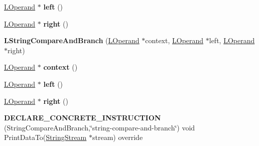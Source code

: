 \begin{DoxyCompactItemize}
\item 
\hyperlink{classv8_1_1internal_1_1_l_operand}{L\+Operand} $\ast$ {\bfseries left} ()\hypertarget{classv8_1_1internal_1_1_l_string_compare_and_branch_a03846e908189b71209c862508f37b51a}{}\label{classv8_1_1internal_1_1_l_string_compare_and_branch_a03846e908189b71209c862508f37b51a}

\item 
\hyperlink{classv8_1_1internal_1_1_l_operand}{L\+Operand} $\ast$ {\bfseries right} ()\hypertarget{classv8_1_1internal_1_1_l_string_compare_and_branch_acb46bd2af08a91bc102ec2b5e919c6b5}{}\label{classv8_1_1internal_1_1_l_string_compare_and_branch_acb46bd2af08a91bc102ec2b5e919c6b5}

\item 
{\bfseries L\+String\+Compare\+And\+Branch} (\hyperlink{classv8_1_1internal_1_1_l_operand}{L\+Operand} $\ast$context, \hyperlink{classv8_1_1internal_1_1_l_operand}{L\+Operand} $\ast$left, \hyperlink{classv8_1_1internal_1_1_l_operand}{L\+Operand} $\ast$right)\hypertarget{classv8_1_1internal_1_1_l_string_compare_and_branch_abdd07c36cdda51e9673d4ee4dfc2734d}{}\label{classv8_1_1internal_1_1_l_string_compare_and_branch_abdd07c36cdda51e9673d4ee4dfc2734d}

\item 
\hyperlink{classv8_1_1internal_1_1_l_operand}{L\+Operand} $\ast$ {\bfseries context} ()\hypertarget{classv8_1_1internal_1_1_l_string_compare_and_branch_a15d4b6ad859b22bf4141edc055fe8050}{}\label{classv8_1_1internal_1_1_l_string_compare_and_branch_a15d4b6ad859b22bf4141edc055fe8050}

\item 
\hyperlink{classv8_1_1internal_1_1_l_operand}{L\+Operand} $\ast$ {\bfseries left} ()\hypertarget{classv8_1_1internal_1_1_l_string_compare_and_branch_a03846e908189b71209c862508f37b51a}{}\label{classv8_1_1internal_1_1_l_string_compare_and_branch_a03846e908189b71209c862508f37b51a}

\item 
\hyperlink{classv8_1_1internal_1_1_l_operand}{L\+Operand} $\ast$ {\bfseries right} ()\hypertarget{classv8_1_1internal_1_1_l_string_compare_and_branch_acb46bd2af08a91bc102ec2b5e919c6b5}{}\label{classv8_1_1internal_1_1_l_string_compare_and_branch_acb46bd2af08a91bc102ec2b5e919c6b5}

\item 
{\bfseries D\+E\+C\+L\+A\+R\+E\+\_\+\+C\+O\+N\+C\+R\+E\+T\+E\+\_\+\+I\+N\+S\+T\+R\+U\+C\+T\+I\+ON} (String\+Compare\+And\+Branch,\char`\"{}string-\/compare-\/and-\/branch\char`\"{}) void Print\+Data\+To(\hyperlink{classv8_1_1internal_1_1_string_stream}{String\+Stream} $\ast$stream) override\hypertarget{classv8_1_1internal_1_1_l_string_compare_and_branch_a2409386853dc077bb377a4f8b8eaf483}{}\label{classv8_1_1internal_1_1_l_string_compare_and_branch_a2409386853dc077bb377a4f8b8eaf483}


\end{DoxyCompactItemize}
